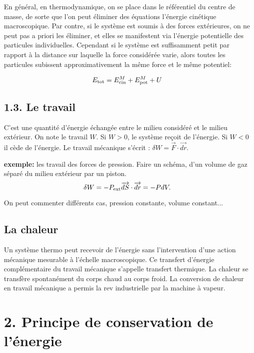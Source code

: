 \documentclass[french, a4paper, 10pt, twocolumn, landscape]{article}
\begin{document}
En général, en thermodynamique, on se place  dans le référentiel du centre de masse, de sorte que l'on peut éliminer des équations l'énergie cinétique macroscopique. Par contre, si le système est soumis à des forces extérieures, on ne peut pas a priori les éliminer, et elles se manifestent via l'énergie potentielle des particules individuelles.  Cependant si le système est suffisamment petit par rapport à la distance sur laquelle la force considérée varie, alors toutes les particules subissent approximativement la même force et le même potentiel: 

\begin{equation}
    E_{\rm tot} = E_{\rm cin}^M+E_{\rm pot}^M + U
\end{equation}

\subsection*{1.3. Le travail}

C'est une quantité d'énergie échangée entre le milieu considéré et le milieu extérieur. On note le travail $W$. Si $W>0$, le système reçoit de l'énergie. Si $W<0$ il cède de l'énergie. Le travail mécanique s'écrit : $\delta W=\vec{F}\cdot \vec{dr}$.

\textbf{exemple:} les travail des forces de pression.
Faire un schéma, d'un volume de gaz séparé du milieu extérieur par un piston.
\begin{equation}
    \delta W = -P_{\rm ext}\vec{dS}\cdot\vec{dr}=-PdV.
\end{equation} 

On peut commenter différents cas, pression constante, volume constant...
\subsection*{La chaleur}

Un système thermo peut recevoir de l'énergie sans l'intervention d'une action mécanique mesurable à l'échelle macroscopique. Ce transfert d'énergie complémentaire du travail mécanique s'appelle transfert thermique. La chaleur se transfère spontanément du corps chaud au corps froid. La conversion de chaleur en travail mécanique a permis la rev industrielle par la machine à vapeur.


\section*{2. Principe de conservation de l'énergie}
\end{document}
